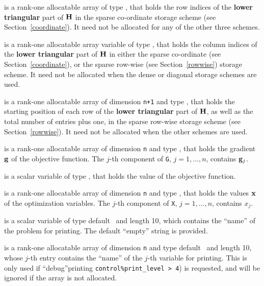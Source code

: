 \documentclass{galahad}
\begin{document}
\begin{description}
\begin{description}
 is a rank-one allocatable array of type \integer,
that holds the row indices of the {\bf lower triangular} part of ${\mathbf{H}}$
in the sparse co-ordinate storage
scheme (see Section~\ref{coordinate}).
It need not be allocated for any of the other three schemes.

 is a rank-one allocatable array variable of type \integer,
that holds the column indices of the {\bf lower triangular} part of
${\mathbf{H}}$ in either the sparse co-ordinate
(see Section~\ref{coordinate}), or the sparse row-wise
(see Section~\ref{rowwise}) storage scheme.
It need not be allocated when the dense or diagonal storage schemes are used.

 is a rank-one allocatable array of dimension {\tt n+1} and type
\integer, that holds the starting position of
each row of the {\bf lower triangular} part of ${\mathbf{H}}$, as well
as the total number of entries plus one, in the sparse row-wise storage
scheme (see Section~\ref{rowwise}). It need not be allocated when the
other schemes are used.

\end{description}

 is a rank-one allocatable array of dimension {\tt n} and type
\realdp, that holds the gradient ${\mathbf{g}}$
of the objective function.
The $j$-th component of
{\tt G}, $j = 1,  \ldots ,  n$, contains ${\mathbf{g}}_{j}$.

 is a scalar variable of type
\realdp, that holds the value of the objective function.

 is a rank-one allocatable array of dimension {\tt n} and type
\realdp,
that holds the values ${\mathbf{x}}$ of the optimization variables.
The $j$-th component of {\tt X}, $j = 1,  \ldots , n$, contains $x_{j}$.

 is a scalar variable of type
default \character\ and length 10, which contains the
``name'' of the problem for printing. The default ``empty'' string is
provided.

 is a rank-one allocatable array of dimension {\tt n} and type
default \character\ and length 10, whose $j$-th entry contains the
``name'' of the $j$-th variable for printing. This is only used
if ``debug''printing {\tt control\%print\_level > 4}) is requested,
and will be ignored if the array is not allocated.

\end{description}

\end{document}
